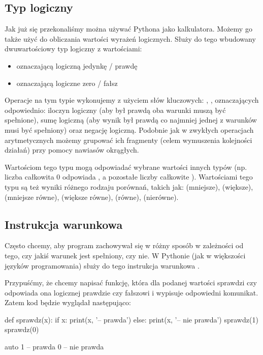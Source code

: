 \documentclass{pdfBooklets}
\begin{document}
\subsection{Typ logiczny}

Jak już się przekonaliśmy można używać Pythona jako kalkulatora. Możemy go także użyć do obliczania wartości wyrażeń logicznych. Służy do tego wbudowany dwuwartościowy typ logiczny z wartościami:
\begin{itemize}
\item {} oznaczającą logiczną jedynkę / prawdę
\item {} oznaczającą logiczne zero / fałsz
\end{itemize}
Operacje na tym typie wykonujemy z użyciem słów kluczowych: , ,  oznaczających odpowiednio:
iloczyn logiczny (aby był prawdą oba warunki muszą być spełnione), sumę logiczną (aby wynik był prawdą co najmniej jednej z warunków musi być spełniony) oraz negację logiczną.
Podobnie jak w zwykłych operacjach arytmetycznych możemy grupować ich fragmenty (celem wymuszenia kolejności działań) przy pomocy nawiasów okrągłych.

Wartościom tego typu mogą odpowiadać wybrane wartości innych typów (np. liczba całkowita 0 odpowiada , a pozostałe liczby całkowite ).
Wartościami tego typu są też wyniki różnego rodzaju porównań, takich jak: \python{<} (mniejsze), \python{>} (większe), \python{<=} (mniejsze równe),
\python{>=} (większe równe), \python{==} (równe), \python{!=} (nierówne).

\subsection{Instrukcja warunkowa }

Często chcemy, aby program zachowywał się w różny sposób w zależności od tego, czy jakiś warunek jest spełniony, czy nie.
W Pythonie (jak w większości języków programowania) służy do tego instrukcja warunkowa .

Przypuśćmy, że chcemy napisać funkcję, która dla podanej wartości sprawdzi czy odpowiada ona logicznej prawdzie czy fałszowi i wypisuje odpowiedni komunikat.
Zatem kod będzie wyglądał następująco:

\begin{CodeFrame}[python]{0.50\textwidth}
def sprawdz(x):
    if x:
        print(x, '-- prawda')
    else:
        print(x, '-- nie prawda')
sprawdz(1)
sprawdz(0)
\end{CodeFrame}
\begin{CodeFrame}{auto}
1 -- prawda
0 -- nie prawda
\end{CodeFrame}
\end{document}

